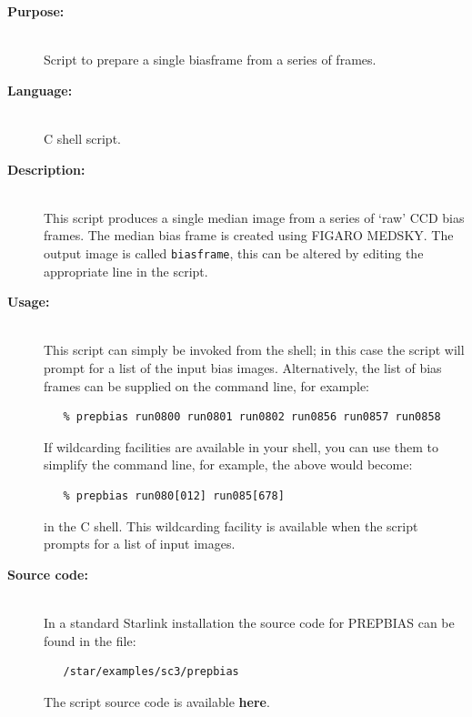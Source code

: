 \documentclass[twoside,11pt]{article}
\newcommand{\htmlref}[2]{#1}
\newenvironment{latexonly}{}{}
\newcommand{\xref}[3]{#1}
\renewcommand{\_}{\texttt{\symbol{95}}}
\begin{document}
\begin{description}

\item [{\bf Purpose:}] \mbox{} \\
     Script to prepare a single biasframe from a series of frames.

\item [{\bf Language:}] \mbox{} \\
     C shell script.

\item [{\bf Description:}] \mbox{} \\
     This script produces a single median image from a series of
     `raw' CCD bias frames.  The median bias frame is created using
     \xref{FIGARO}{sun86}{} \xref{MEDSKY}{sun86}{MEDSKY}.  The output
     image is called \verb+biasframe+, this can be altered by editing
     the appropriate line in the script.

\item [{\bf Usage:}] \mbox{} \\
     This script can simply be invoked from the shell; in this case
     the script will prompt for a list of the input bias images.
     Alternatively, the list of bias frames can be supplied on the
     command line, for example:

\begin{verbatim}
   % prepbias run0800 run0801 run0802 run0856 run0857 run0858
\end{verbatim}

     If wildcarding facilities are available in your shell, you can use
     them to simplify the command line, for example, the above would
     become:

\begin{verbatim}
   % prepbias run080[012] run085[678]
\end{verbatim}

     in the C shell.  This wildcarding facility is available when the
     script prompts for a list of input images.

\item [{\bf Source code:}] \mbox{} \\
\begin{latexonly}
In a standard Starlink installation the source code for PREPBIAS can be found
in the file:
\begin{verbatim}
   /star/examples/sc3/prepbias
\end{verbatim}
\end{latexonly}
\begin{htmlonly}
      The script source code is available
      \htmlref{{\bf here}}{se_prepbias_source}.
\end{htmlonly}


\end{description}
\end{document}
